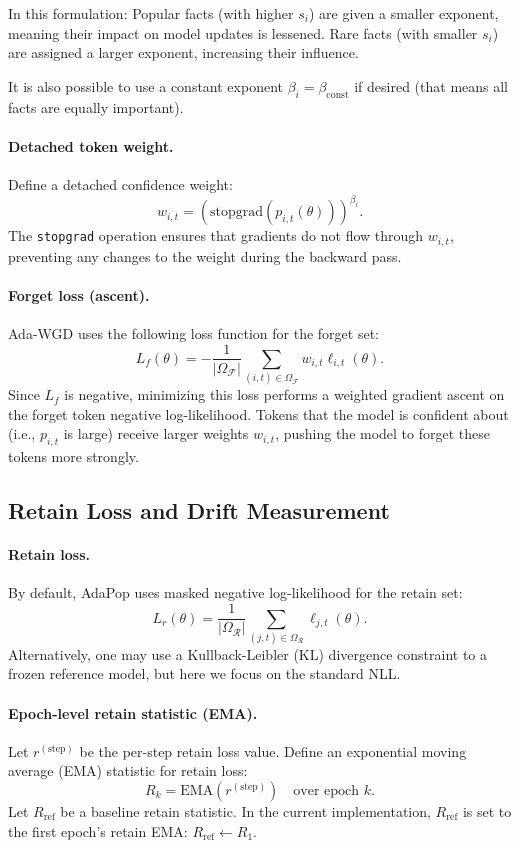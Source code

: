 In this formulation: Popular facts (with higher \( s_i \)) are given a smaller exponent, meaning their impact on model updates is lessened. Rare facts (with smaller \( s_i \)) are assigned a larger exponent, increasing their influence.

It is also possible to use a constant exponent \( \beta_i = \beta_{\mathrm{const}} \) if desired (that means all facts are equally important). 

\paragraph{Detached token weight.}  
Define a detached confidence weight:
\[
w_{i,t} = \left(\mathrm{stopgrad}(p_{i,t}(\theta))\right)^{\beta_i}.
\]
The \texttt{stopgrad} operation ensures that gradients do not flow through \( w_{i,t} \), preventing any changes to the weight during the backward pass.

\paragraph{Forget loss (ascent).}  
Ada-WGD uses the following loss function for the forget set:
\[
L_f(\theta) = -\frac{1}{|\Omega_{\mathcal{F}}|} \sum_{(i,t) \in \Omega_{\mathcal{F}}} w_{i,t} \ell_{i,t}(\theta).
\]
Since \( L_f \) is negative, minimizing this loss performs a weighted gradient ascent on the forget token negative log-likelihood. Tokens that the model is confident about (i.e., \( p_{i,t} \) is large) receive larger weights \( w_{i,t} \), pushing the model to forget these tokens more strongly.

\subsection{Retain Loss and Drift Measurement}

\paragraph{Retain loss.}  
By default, AdaPop uses masked negative log-likelihood for the retain set:
\[
L_r(\theta) = \frac{1}{|\Omega_{\mathcal{R}}|} \sum_{(j,t) \in \Omega_{\mathcal{R}}} \ell_{j,t}(\theta).
\]
Alternatively, one may use a Kullback-Leibler (KL) divergence constraint to a frozen reference model, but here we focus on the standard NLL.

\paragraph{Epoch-level retain statistic (EMA).}  
Let \( r^{(\mathrm{step})} \) be the per-step retain loss value. Define an exponential moving average (EMA) statistic for retain loss:
\[
R_k = \mathrm{EMA}\left(r^{(\mathrm{step})}\right) \quad \text{over epoch } k.
\]
Let \( R_{\mathrm{ref}} \) be a baseline retain statistic. In the current implementation, \( R_{\mathrm{ref}} \) is set to the first epoch's retain EMA:  
\( R_{\mathrm{ref}} \leftarrow R_1 \).

